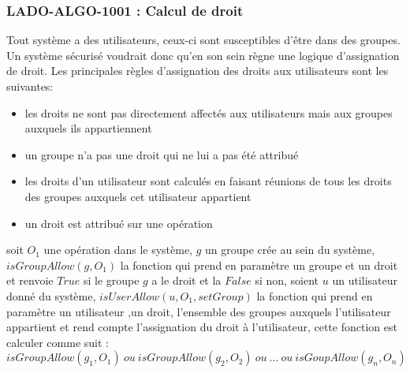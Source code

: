 \documentclass[12pt,a4paper]{report}
\begin{document}
\subsubsection{LADO-ALGO-1001 : Calcul de droit}
Tout système a des utilisateurs, ceux-ci sont susceptibles d'être dans des groupes. Un système sécurisé voudrait donc qu'en son sein règne une logique d'assignation de droit. Les principales règles d'assignation des droits aux utilisateurs sont les suivantes: 
\begin{itemize}
\item les droits ne sont pas directement affectés aux utilisateurs mais aux groupes auxquels ils appartiennent
\item un groupe n'a pas une droit qui ne lui a pas été attribué 
\item les droits d'un utilisateur sont calculés en faisant réunions de tous les droits des groupes auxquels cet utilisateur appartient
\item un droit est attribué sur une opération
\end{itemize}  
soit $O_1$ une opération dans le système, $g$ un groupe crée au sein du système, \textbf{$isGroupAllow(g, O_1)$} la fonction qui prend en paramètre un groupe et un droit et renvoie $True$ si le groupe $g$ a le droit et la $False$ si non, soient $u$ un utilisateur donné du système, \textbf{$isUserAllow(u, O_1, setGroup)$} la fonction qui prend en paramètre un utilisateur ,un droit, l'ensemble des groupes auxquels l'utilisateur appartient et rend compte l'assignation du droit à l'utilisateur, cette fonction est calculer comme suit : \\
\textbf{$isGroupAllow(g_1, O_1)\ ou\ isGroupAllow(g_2, O_2)\ ou\ ...\ ou\ isGoupAllow(g_n,O_n)$}
\end{document}
